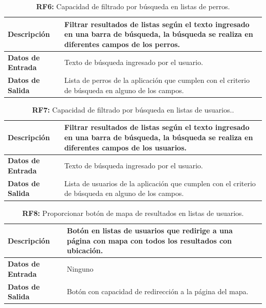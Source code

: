 \documentclass[a4paper, 12pt]{article}
\begin{document}
\begin{table}[H]
\captionsetup{justification=raggedright,singlelinecheck=false}
\caption{\textbf{RF6:} Capacidad de filtrado por búsqueda en listas de perros.}
\label{tab:RF6}
	\begin{tabular}{|m{5cm}|m{10cm}|}
	\hline
	\textbf{Descripción} & Filtrar resultados de listas según el texto ingresado en una barra de búsqueda, la búsqueda se realiza en diferentes campos de los perros. \\ 
	\hline
	\textbf{Datos de Entrada} & Texto de búsqueda ingresado por el usuario. \\ 
	\hline
	\textbf{Datos de Salida} &  Lista de perros de la aplicación que cumplen con el criterio de búsqueda en alguno de los campos. \\ 
	\hline
\end{tabular}
\end{table}

\begin{table}[H]
\captionsetup{justification=raggedright,singlelinecheck=false}
\caption{\textbf{RF7:} Capacidad de filtrado por búsqueda en listas de usuarios..}
\label{tab:RF7}
	\begin{tabular}{|m{5cm}|m{10cm}|}
\hline
	\textbf{Descripción} & Filtrar resultados de listas según el texto ingresado en una barra de búsqueda, la búsqueda se realiza en diferentes campos de los usuarios. \\ 
	\hline
	\textbf{Datos de Entrada} & Texto de búsqueda ingresado por el usuario. \\ 
	\hline
	\textbf{Datos de Salida} &  Lista de usuarios de la aplicación que cumplen con el criterio de búsqueda en alguno de los campos. \\ 
	\hline
\end{tabular}
\end{table}

\begin{table}[H]
\captionsetup{justification=raggedright,singlelinecheck=false}
\caption{\textbf{RF8:}  Proporcionar botón de mapa de resultados en listas de usuarios.}
\label{tab:RF8}
	\begin{tabular}{|m{5cm}|m{10cm}|}
	\hline
	\textbf{Descripción} & Botón en listas de usuarios que redirige a una página con mapa con todos los resultados con ubicación. \\ 
	\hline
	\textbf{Datos de Entrada} & Ninguno \\ 
	\hline
	\textbf{Datos de Salida} & Botón con capacidad de redirección a la página del mapa. \\ 
	\hline
\end{tabular}
\end{table}
\end{document}

